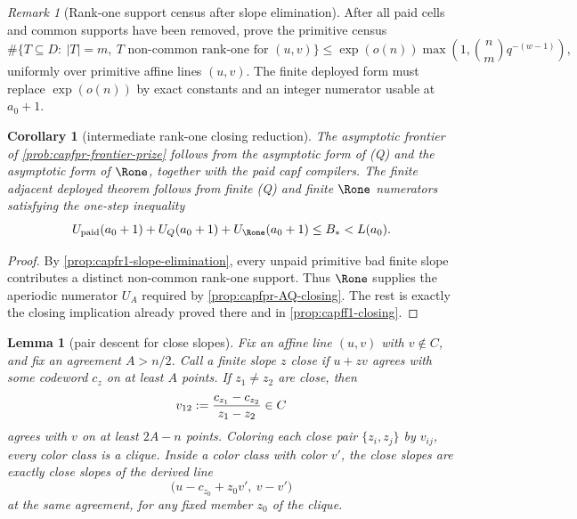 \documentclass[11pt]{article}
\newtheorem{lemma}[lemma]{Lemma}
\newtheorem{corollary}[corollary]{Corollary}
\theoremstyle{definition}
\theoremstyle{remark}
\newtheorem{remark}[remark]{Remark}
\begin{document}
\begin{remark}[Rank-one support census after slope elimination]\label{prob:capfr1-rank-one-census}
After all paid cells and common supports have been removed, prove the primitive census
\[
        \#\{T\subseteq D:\ |T|=m,\ T\text{ non-common rank-one for }(u,v)\}
        \le
        \exp(o(n))\max\left(1,\binom n m q^{-(w-1)}\right),
\]
uniformly over primitive affine lines \((u,v)\).  The finite deployed form must replace \(\exp(o(n))\) by exact constants and an integer numerator usable at \(a_0+1\).
\end{remark}

\begin{corollary}[intermediate rank-one closing reduction]\label{cor:capfr1-Q-R1-closing}
The asymptotic frontier of \cref{prob:capfpr-frontier-prize} follows from the asymptotic form of \textup{(Q)} and the asymptotic form of \(\Rone\), together with the paid capf compilers.  The finite adjacent deployed theorem follows from finite \textup{(Q)} and finite \(\Rone\) numerators satisfying the one-step inequality
\[
        U_{\rm paid}(a_0+1)+U_Q(a_0+1)+U_{\Rone}(a_0+1)
        \le B_*<L(a_0).
\]
\end{corollary}

\begin{proof}
By \cref{prop:capfr1-slope-elimination}, every unpaid primitive bad finite slope contributes a distinct non-common rank-one support.  Thus \(\Rone\) supplies the aperiodic numerator \(U_A\) required by \cref{prop:capfpr-AQ-closing}.  The rest is exactly the closing implication already proved there and in \cref{prop:capff1-closing}.
\end{proof}

\begin{lemma}[pair descent for close slopes]\label{lem:capfr1-pair-descent}
Fix an affine line \((u,v)\) with \(v\notin C\), and fix an agreement \(A>n/2\).  Call a finite slope \(z\) close if \(u+zv\) agrees with some codeword \(c_z\) on at least \(A\) points.  If \(z_1\ne z_2\) are close, then
\[
        v_{12}:={c_{z_1}-c_{z_2}\over z_1-z_2}\in C
\]
agrees with \(v\) on at least \(2A-n\) points.  Coloring each close pair \(\{z_i,z_j\}\) by \(v_{ij}\), every color class is a clique.  Inside a color class with color \(v'\), the close slopes are exactly close slopes of the derived line
\[
        \bigl(u-c_{z_0}+z_0v',\ v-v'\bigr)
\]
at the same agreement, for any fixed member \(z_0\) of the clique.
\end{lemma}
\end{document}
